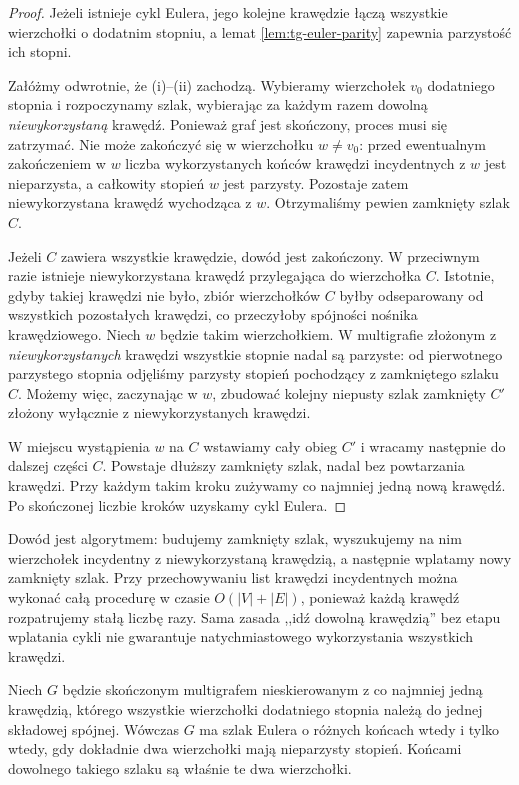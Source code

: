 \begin{proof}
Jeżeli istnieje cykl Eulera, jego kolejne krawędzie łączą
wszystkie wierzchołki o dodatnim stopniu, a lemat
\ref{lem:tg-euler-parity} zapewnia parzystość ich stopni.

Załóżmy odwrotnie, że (i)--(ii) zachodzą. Wybieramy wierzchołek
$v_0$ dodatniego stopnia i rozpoczynamy szlak, wybierając
za każdym razem dowolną \emph{niewykorzystaną} krawędź.
Ponieważ graf jest skończony, proces musi się zatrzymać.
Nie może zakończyć się w wierzchołku $w\ne v_0$:
przed ewentualnym zakończeniem w $w$ liczba wykorzystanych
końców krawędzi incydentnych z $w$ jest nieparzysta,
a całkowity stopień $w$ jest parzysty. Pozostaje zatem
niewykorzystana krawędź wychodząca z $w$.
Otrzymaliśmy pewien zamknięty szlak $C$.

Jeżeli $C$ zawiera wszystkie krawędzie, dowód jest zakończony.
W przeciwnym razie istnieje niewykorzystana krawędź
przylegająca do wierzchołka $C$. Istotnie, gdyby takiej
krawędzi nie było, zbiór wierzchołków $C$ byłby odseparowany
od wszystkich pozostałych krawędzi, co przeczyłoby spójności
nośnika krawędziowego. Niech $w$ będzie takim wierzchołkiem.
W multigrafie złożonym z \emph{niewykorzystanych} krawędzi
wszystkie stopnie nadal są parzyste: od pierwotnego
parzystego stopnia odjęliśmy parzysty stopień pochodzący
z zamkniętego szlaku $C$. Możemy więc, zaczynając w $w$,
zbudować kolejny niepusty szlak zamknięty $C'$ złożony
wyłącznie z niewykorzystanych krawędzi.

W miejscu wystąpienia $w$ na $C$ wstawiamy cały obieg $C'$
i wracamy następnie do dalszej części $C$. Powstaje dłuższy
zamknięty szlak, nadal bez powtarzania krawędzi.
Przy każdym takim kroku zużywamy co najmniej jedną nową
krawędź. Po skończonej liczbie kroków uzyskamy cykl Eulera.
\end{proof}

\begin{uwaga}
Dowód jest algorytmem: budujemy zamknięty szlak, wyszukujemy
na nim wierzchołek incydentny z niewykorzystaną krawędzią,
a następnie wplatamy nowy zamknięty szlak. Przy przechowywaniu
list krawędzi incydentnych można wykonać całą procedurę w czasie
$O(|V|+|E|)$, ponieważ każdą krawędź rozpatrujemy
stałą liczbę razy. Sama zasada ,,idź dowolną krawędzią''
bez etapu wplatania cykli nie gwarantuje natychmiastowego
wykorzystania wszystkich krawędzi.
\end{uwaga}

\begin{twierdzenie}
\label{thm:tg-euler-trail}
Niech $G$ będzie skończonym multigrafem nieskierowanym
z co najmniej jedną krawędzią, którego wszystkie wierzchołki
dodatniego stopnia należą do jednej składowej spójnej.
Wówczas $G$ ma szlak Eulera o różnych końcach wtedy
i tylko wtedy, gdy dokładnie dwa wierzchołki mają
nieparzysty stopień. Końcami dowolnego takiego szlaku
są właśnie te dwa wierzchołki.
\end{twierdzenie}

